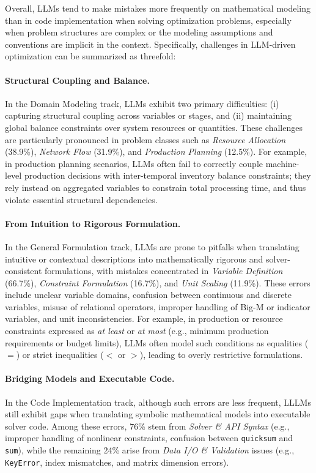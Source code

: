 \documentclass[sigconf, nonacm]{acmart}
\begin{document}
Overall, LLMs tend to make mistakes more frequently on mathematical modeling than in code implementation when solving optimization problems, especially when problem structures are complex or the modeling assumptions and conventions are implicit in the context. Specifically, challenges in LLM-driven optimization can be summarized as threefold:

\paragraph{\textbf{Structural Coupling and Balance.}}
In the Domain Modeling track, LLMs exhibit two primary difficulties: (i) capturing structural coupling across variables or stages, and (ii) maintaining global balance constraints over system resources or quantities. These challenges are particularly pronounced in problem classes such as \emph{Resource Allocation} (38.9\%), \emph{Network Flow} (31.9\%), and \emph{Production Planning} (12.5\%). For example, in production planning scenarios, LLMs often fail to correctly couple machine-level production decisions with inter-temporal inventory balance constraints; they rely instead on aggregated variables to constrain total processing time, and thus violate essential structural dependencies.

\paragraph{\textbf{From Intuition to Rigorous Formulation.}}
In the General Formulation track, LLMs are prone to pitfalls when translating intuitive or contextual descriptions into mathematically rigorous and solver-consistent formulations, with mistakes concentrated in \emph{Variable Definition} (66.7\%), \emph{Constraint Formulation} (16.7\%), and \emph{Unit Scaling} (11.9\%). These errors include unclear variable domains, confusion between continuous and discrete variables, misuse of relational operators, improper handling of Big-M or indicator variables, and unit inconsistencies. For example, in production or resource constraints expressed as \emph{at least} or \emph{at most} (e.g., minimum production requirements or budget limits), LLMs often model such conditions as equalities ($=$) or strict inequalities ($<$ or $>$), leading to overly restrictive formulations.

\paragraph{\textbf{Bridging Models and Executable Code.}}
In the Code Implementation track, although such errors are less frequent, LLLMs still exhibit gaps when translating symbolic mathematical models into executable solver code. Among these errors, 76\% stem from \emph{Solver \& API Syntax} (e.g., improper handling of nonlinear constraints, confusion between \texttt{quicksum} and \texttt{sum}), while the remaining 24\% arise from \emph{Data I/O \& Validation} issues (e.g., \texttt{KeyError}, index mismatches, and matrix dimension errors).
\end{document}
